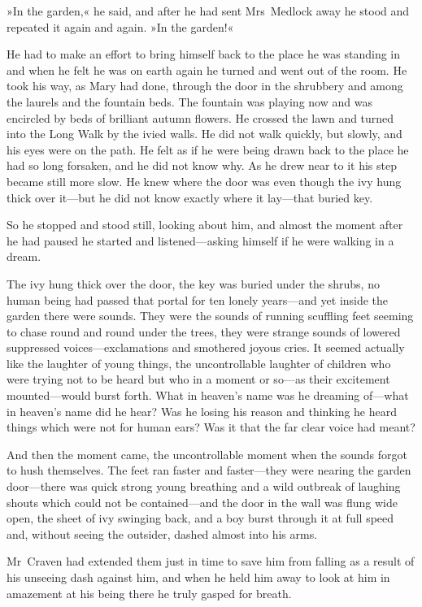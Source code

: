 »In the garden,« he said, and after he had sent Mrs~Medlock away he stood and repeated it again and again. »In the garden!«

He had to make an effort to bring himself back to the place he was standing in and when he felt he was on earth again he turned and went out of the room. He took his way, as Mary had done, through the door in the shrubbery and among the laurels and the fountain beds. The fountain was playing now and was encircled by beds of brilliant autumn flowers. He crossed the lawn and turned into the Long Walk by the ivied walls. He did not walk quickly, but slowly, and his eyes were on the path. He felt as if he were being drawn back to the place he had so long forsaken, and he did not know why. As he drew near to it his step became still more slow. He knew where the door was even though the ivy hung thick over it—but he did not know exactly where it lay—that buried key.

So he stopped and stood still, looking about him, and almost the moment after he had paused he started and listened—asking himself if he were walking in a dream.

The ivy hung thick over the door, the key was buried under the shrubs, no human being had passed that portal for ten lonely years—and yet inside the garden there were sounds. They were the sounds of running scuffling feet seeming to chase round and round under the trees, they were strange sounds of lowered suppressed voices—exclamations and smothered joyous cries. It seemed actually like the laughter of young things, the uncontrollable laughter of children who were trying not to be heard but who in a moment or so—as their excitement mounted—would burst forth. What in heaven's name was he dreaming of—what in heaven's name did he hear? Was he losing his reason and thinking he heard things which were not for human ears? Was it that the far clear voice had meant?

And then the moment came, the uncontrollable moment when the sounds forgot to hush themselves. The feet ran faster and faster—they were nearing the garden door—there was quick strong young breathing and a wild outbreak of laughing shouts which could not be contained—and the door in the wall was flung wide open, the sheet of ivy swinging back, and a boy burst through it at full speed and, without seeing the outsider, dashed almost into his arms.

Mr~Craven had extended them just in time to save him from falling as a result of his unseeing dash against him, and when he held him away to look at him in amazement at his being there he truly gasped for breath.

